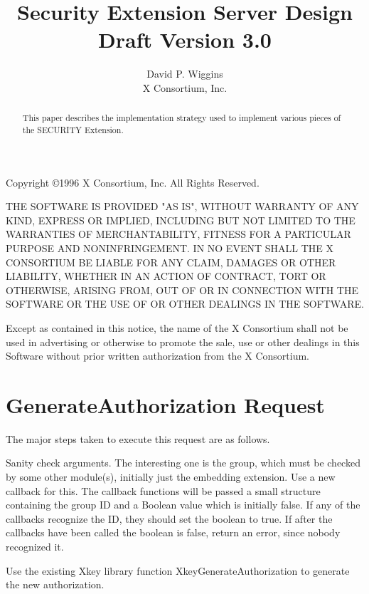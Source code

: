 \documentclass{article}
\begin{document}
\title{Security Extension Server Design\\Draft Version 3.0}
\author{David P. Wiggins\\X Consortium, Inc.}
\maketitle

\begin{abstract}
This paper describes the implementation strategy used to implement
various pieces of the SECURITY Extension.
\end{abstract}
\thispagestyle{empty}

\eject

Copyright \copyright 1996 X Consortium, Inc.  All Rights Reserved.

THE SOFTWARE IS PROVIDED "AS IS", WITHOUT WARRANTY OF ANY KIND,
EXPRESS OR IMPLIED, INCLUDING BUT NOT LIMITED TO THE WARRANTIES OF
MERCHANTABILITY, FITNESS FOR A PARTICULAR PURPOSE AND NONINFRINGEMENT.
IN NO EVENT SHALL THE X CONSORTIUM BE LIABLE FOR ANY CLAIM, DAMAGES OR
OTHER LIABILITY, WHETHER IN AN ACTION OF CONTRACT, TORT OR OTHERWISE,
ARISING FROM, OUT OF OR IN CONNECTION WITH THE SOFTWARE OR THE USE OF
OR OTHER DEALINGS IN THE SOFTWARE.

Except as contained in this notice, the name of the X Consortium shall
not be used in advertising or otherwise to promote the sale, use or
other dealings in this Software without prior written authorization
from the X Consortium.

\eject

\section{GenerateAuthorization Request}

The major steps taken to execute this request are as follows.

Sanity check arguments.  The interesting one is the group, which must
be checked by some other module(s), initially just the embedding
extension.  Use a new callback for this.  The callback functions will
be passed a small structure containing the group ID and a Boolean
value which is initially false.  If any of the callbacks recognize the
ID, they should set the boolean to true.  If after the callbacks have
been called the boolean is false, return an error, since nobody
recognized it.

Use the existing Xkey library function XkeyGenerateAuthorization to
generate the new authorization.
\end{document}
